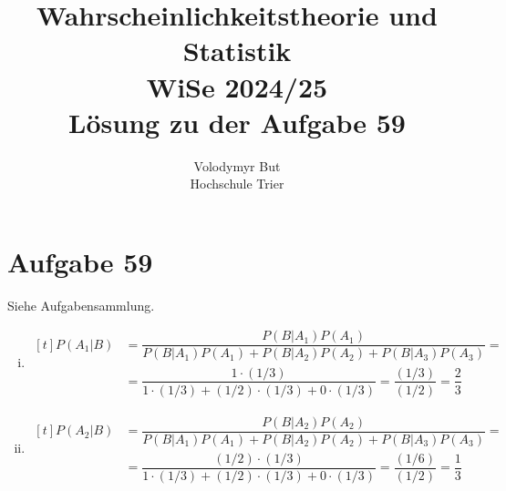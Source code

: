\documentclass[10pt, oneside]{article}
\title{Wahrscheinlichkeitstheorie und Statistik\\[10pt]\Large{WiSe 2024/25}\\[15pt]\Large{L{\"o}sung zu der Aufgabe 59}}
\author{Volodymyr But\\[10pt]Hochschule Trier}
\date{}
\begin{document}
\maketitle
\vspace{25px}

\section{Aufgabe 59}

Siehe Aufgabensammlung.
\begin{enumerate}[i)]
    \item
        $\begin{aligned}[t]
            P(A_1|B) &= \dfrac{P(B|A_1)P(A_1)}{P(B|A_1)P(A_1) + P(B|A_2)P(A_2) + P(B|A_3)P(A_3)} = \\
                     &= \dfrac{1 \cdot (1/3)}{1 \cdot (1/3) + (1/2) \cdot (1/3) + 0 \cdot (1/3)} = \dfrac{(1 / 3)}{(1/2)} = \dfrac{2}{3}
        \end{aligned}$
    \item
        $\begin{aligned}[t]
            P(A_2|B) &= \dfrac{P(B|A_2)P(A_2)}{P(B|A_1)P(A_1) + P(B|A_2)P(A_2) + P(B|A_3)P(A_3)} = \\
                     &= \dfrac{(1/2) \cdot (1/3)}{1 \cdot (1/3) + (1/2) \cdot (1/3) + 0 \cdot (1/3)} = \dfrac{(1/6)}{(1/2)} = \dfrac{1}{3}
        \end{aligned}$
\end{enumerate}
\end{document}
